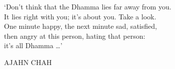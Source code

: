 {\begin{minipage}[c][\textheight][c]{\paperwidth}
\begin{minipage}{\paperwidth}
{`Don't think that the Dhamma lies far away from you.\\ It lies right with you; it's about you. Take a look.\\ One minute happy, the next minute sad, satisfied,\\ then angry at this person, hating that person:\\ it's all Dhamma \ldots{}'
\vspace*{2\baselineskip}}

{\smaller\MakeUppercase{Ajahn Chah}}

\end{minipage}

\end{minipage}

\clearpage\thispagestyle{empty}



}

